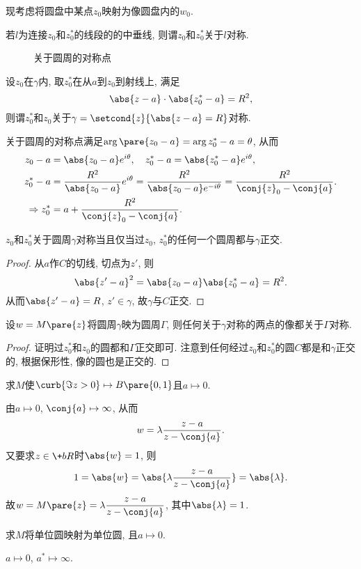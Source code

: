 \documentclass{ctexart}
\begin{document}
现考虑将圆盘中某点$z_0$映射为像圆盘内的$w_0$.
\begin{definition}
    若$l$为连接$z_0$和$z^*_0$的线段的的中垂线, 则谓$z_0$和$z^*_0$关于$l$对称.
\end{definition}
\begin{figure}[ht]
    \centering
    \caption{关于圆周的对称点}
\end{figure}
\begin{remark}
    设$z_0$在$\gamma$内, 取$z_0^*$在从$a$到$z_0$到射线上, 满足
    \[ \abs{z-a}\cdot \abs{z_0^* - a} = R^2, \]
    则谓$z_0^*$和$z_0$关于$\gamma = \setcond{z}{\abs{z-a} = R}$对称.
\end{remark}
关于圆周的对称点满足$\arg\pare{z_0 - a} = \arg{z_0^* - a} = \theta$, 从而
\begin{align*}
    z_0 - a &= \abs{z_0 - a}e^{i\theta},\quad z_0^* - a = \abs{z_0^* - a}e^{i\theta}, \\
    z_0^* - a &= \frac{R^2}{\abs{z_0 - a}}e^{i\theta} = \frac{R^2}{\abs{z_0 - a}e^{-i\theta}} = \frac{R^2}{\conj{z}_0 - \conj{a}}. \\
    \Rightarrow z_0^* &= a + \frac{R^2}{\conj{z}_0 - \conj{a}}.
\end{align*}
\begin{figure}[ht]
    \centering
\end{figure}
\begin{lemma}
    $z_0$和$z_0^*$关于圆周$\gamma$对称当且仅当过$z_0$, $z_0^*$的任何一个圆周都与$\gamma$正交.
\end{lemma}
\begin{proof}
    从$a$作$C$的切线, 切点为$z'$, 则
    \[ \abs{z'-a}^2 = \abs{z_0 - a}\abs{z_0^* - a} = R^2. \]
    从而$\abs{z'-a} = R$, $z'\in \gamma$, 故$\gamma$与$C$正交.
\end{proof}
\begin{theorem}
    设$w=M\pare{z}$将圆周$\gamma$映为圆周$\Gamma$, 则任何关于$\gamma$对称的两点的像都关于$\Gamma$对称. 
\end{theorem}
\begin{proof}
    证明过$z_0^*$和$z_0$的圆都和$\Gamma$正交即可. 注意到任何经过$z_0$和$z_0^*$的圆$C$都是和$\gamma$正交的, 根据保形性, 像的圆也是正交的.
\end{proof}
\begin{sample}
    \begin{ex}
        求$M$使$\curb{\Im z>0}\mapsto B\pare{0,1}$且$a\mapsto 0$.
    \end{ex}
    \begin{solution}
        由$a\mapsto 0$, $\conj{a}\mapsto \infty$, 从而
        \[ w = \lambda \frac{z-a}{z-\conj{a}}. \]
        又要求$z\in\+bR$时$\abs{w} = 1$, 则
        \[ 1 = \abs{w} = \abs{\lambda \frac{z-a}{z-\conj{a}}} = \abs{\lambda}. \]
        故$\displaystyle w = M\pare{z} = \lambda \frac{z-a}{z-\conj{a}}$, 其中$\abs{\lambda} = 1$.
    \end{solution}
\end{sample}
\begin{sample}
    \begin{ex}
        求$M$将单位圆映射为单位圆, 且$a\mapsto 0$.
    \end{ex}
    \begin{solution}
        $a\mapsto 0$, $a^* \mapsto \infty$.
    \end{solution}
\end{sample}


\end{document}

